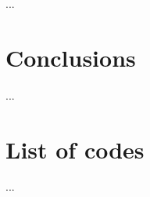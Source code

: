 \documentclass{article}
\begin{document}
\begin{multicols}{2}
...




\section{Conclusions}

...





\section{List of codes}

...

\end{multicols}
\end{document}
